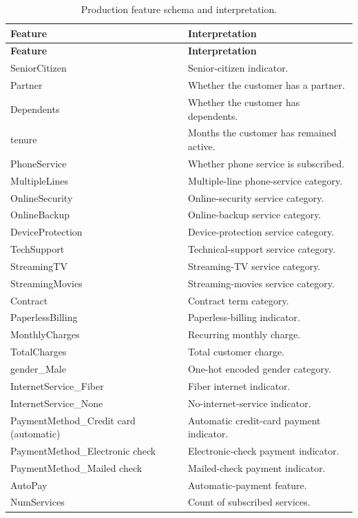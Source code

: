 \documentclass[9pt]{article}
\begin{document}
\small
\begin{longtable}{p{}p{}}
\caption{Production feature schema and interpretation.}\label{tab:features}\\
\toprule
\textbf{Feature} & \textbf{Interpretation}\\
\midrule
\endfirsthead
\toprule
\textbf{Feature} & \textbf{Interpretation}\\
\midrule
\endhead
\bottomrule
\endfoot
SeniorCitizen & Senior-citizen indicator.\\
Partner & Whether the customer has a partner.\\
Dependents & Whether the customer has dependents.\\
tenure & Months the customer has remained active.\\
PhoneService & Whether phone service is subscribed.\\
MultipleLines & Multiple-line phone-service category.\\
OnlineSecurity & Online-security service category.\\
OnlineBackup & Online-backup service category.\\
DeviceProtection & Device-protection service category.\\
TechSupport & Technical-support service category.\\
StreamingTV & Streaming-TV service category.\\
StreamingMovies & Streaming-movies service category.\\
Contract & Contract term category.\\
PaperlessBilling & Paperless-billing indicator.\\
MonthlyCharges & Recurring monthly charge.\\
TotalCharges & Total customer charge.\\
gender\_Male & One-hot encoded gender category.\\
InternetService\_Fiber & Fiber internet indicator.\\
InternetService\_None & No-internet-service indicator.\\
PaymentMethod\_Credit card (automatic) & Automatic credit-card payment indicator.\\
PaymentMethod\_Electronic check & Electronic-check payment indicator.\\
PaymentMethod\_Mailed check & Mailed-check payment indicator.\\
AutoPay & Automatic-payment feature.\\
NumServices & Count of subscribed services.\\

\end{longtable}
\end{document}
